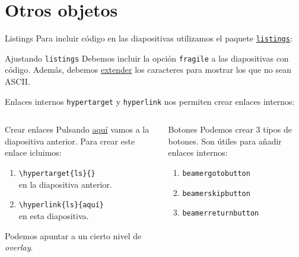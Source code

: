 \section{Otros objetos}

\begin{frame}{Listings}
  \hypertarget{ls}{}
  Para incluir código en las diapositivas utilizamos el paquete
  \href{https://www.ctan.org/tex-archive/macros/latex/contrib/listings}{\texttt{listings}}:
  \espacio
  \espacio
  \pause
  \begin{alertblock}{Ajustando \texttt{listings}}
    Debemos incluir la opción \texttt{fragile} a las diapositivas con código.
    Además, debemos \href{http://tex.stackexchange.com/questions/24528}{extender}
    los caracteres para mostrar los que no sean ASCII.
  \end{alertblock}
\end{frame}

\begin{frame}{Enlaces internos}
  \texttt{hypertarget} y \texttt{hyperlink} nos permiten crear enlaces internos:
  \espacio
  \begin{columns}
      \pause
      \begin{exampleblock}{Crear enlaces}
        Pulsando \hyperlink{ls}{\color{links}aquí} vamos a la diapositiva anterior. Para
        crear este enlace icluimos:
        \begin{enumerate}
          \item \texttt{\textbackslash {\color{keywords}hypertarget}\{ls\}\{\}} \\
          en la diapositiva anterior.
          \item \texttt{\textbackslash {\color{keywords}hyperlink}\{ls\}\{aquí\}} \\
          en esta diapositiva.
        \end{enumerate}

        Podemos apuntar a un cierto nivel de \textit{overlay}.
      \end{exampleblock}
      \pause
      \begin{exampleblock}{Botones}
        Podemos crear 3 tipos de botones. Son útiles para añadir enlaces internos:
        \begin{enumerate}
          \item \texttt{beamergotobutton}   \\ \hyperlink{graphs}{}
          \item \texttt{beamerskipbutton}   \\ \hyperlink{end}{}
          \item \texttt{beamerreturnbutton} \\ \hyperlink{index}{}
        \end{enumerate}
      \end{exampleblock}
  \end{columns}
\end{frame}

